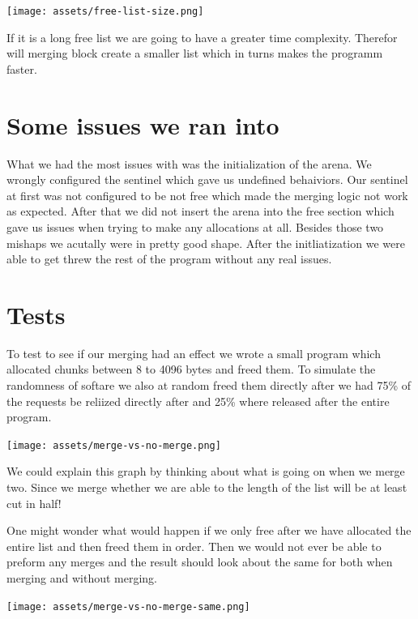 \documentclass{article}
\begin{document}
\begin{center}
    \texttt{[image: assets/free-list-size.png]}
\end{center}


If it is a long free list we are going to have a greater time complexity. Therefor will merging block create a smaller list which in turns makes the programm faster.


\section{Some issues we ran into}

What we had the most issues with was the initialization of the arena. We wrongly configured the sentinel which gave us undefined behaiviors. Our sentinel at first was not configured to be not free which made the merging logic not work as expected. After that we did not insert the arena into the free section which gave us issues when trying to make any allocations at all. Besides those two mishaps we acutally were in pretty good shape. After the initliatization we were able to get threw the rest of the program without any real issues.



\section{Tests}

To test to see if our merging had an effect we wrote a small program which allocated chunks between 8 to 4096 bytes and freed them. To simulate the randomness of softare we also at random freed them directly after we had 75\% of the requests be reliized directly after and 25\% where released after the entire program.

\begin{center}
    \texttt{[image: assets/merge-vs-no-merge.png]}
\end{center}

We could explain this graph by thinking about what is going on when we merge two. Since we merge whether we are able to the length of the list will be at least cut in half!

One might wonder what would happen if we only free after we have allocated the entire list and then freed them in order. Then we would not ever be able to preform any merges and the result should look about the same for both when merging and without merging.

\begin{center}
    \texttt{[image: assets/merge-vs-no-merge-same.png]}
\end{center}
\end{document}
